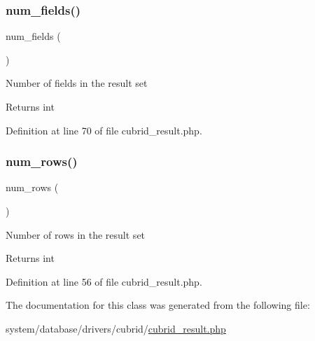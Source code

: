 \mbox{\label{class_c_i___d_b__cubrid__result_af831bf363e4d7d661a717a4932af449d}} 
\subsubsection{\texorpdfstring{num\_fields()}{num\_fields()}}
{\footnotesize\ttfamily num\+\_\+fields (\begin{DoxyParamCaption}{ }\end{DoxyParamCaption})}

Number of fields in the result set

\begin{DoxyReturn}{Returns}
int 
\end{DoxyReturn}


Definition at line 70 of file cubrid\+\_\+result.\+php.

\mbox{\label{class_c_i___d_b__cubrid__result_a218657c303ee499b97710ab0cd2f5d6e}} 
\subsubsection{\texorpdfstring{num\_rows()}{num\_rows()}}
{\footnotesize\ttfamily num\+\_\+rows (\begin{DoxyParamCaption}{ }\end{DoxyParamCaption})}

Number of rows in the result set

\begin{DoxyReturn}{Returns}
int 
\end{DoxyReturn}


Definition at line 56 of file cubrid\+\_\+result.\+php.



The documentation for this class was generated from the following file\+:\begin{DoxyCompactItemize}
\item 
system/database/drivers/cubrid/\mbox{\hyperlink{cubrid__result_8php}{cubrid\+\_\+result.\+php}}\end{DoxyCompactItemize}
